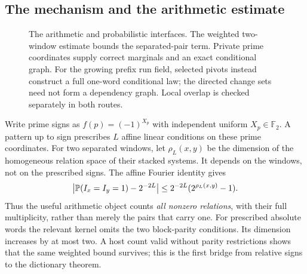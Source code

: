 \subsection{The mechanism and the arithmetic estimate}
\begin{figure}[H]
\centering
{}
\caption{The arithmetic and probabilistic interfaces. The weighted two-window
estimate bounds the separated-pair term. Private prime coordinates supply
correct marginals and an exact conditional graph. For the growing prefix
run field, selected pivots instead construct a full one-word conditional
law; the directed change sets need not form a dependency graph. Local
overlap is checked separately in both routes.}\label{fig:proof-flow}
\end{figure}

Write prime signs as $f(p)=(-1)^{X_p}$ with independent uniform
$X_p\in\mathbb F_2$. A pattern up to sign prescribes $L$ affine linear
conditions on these prime coordinates. For two separated windows, let
$\rho_L(x,y)$ be the dimension of the homogeneous relation space of their
stacked systems. It depends on the windows, not on the prescribed signs.
The affine Fourier identity gives
\[
 \left|\mathbb P(I_x=I_y=1)-2^{-2L}\right|
 \le 2^{-2L}(2^{\rho_L(x,y)}-1).
\]
Thus the useful arithmetic object counts \emph{all nonzero relations},
with their full multiplicity, rather than merely the pairs that carry one.
For prescribed absolute words the relevant kernel omits the two block-parity
conditions. Its dimension increases by at most two. A host count valid
without parity restrictions shows that the same weighted bound survives;
this is the first bridge from relative signs to the dictionary theorem.

